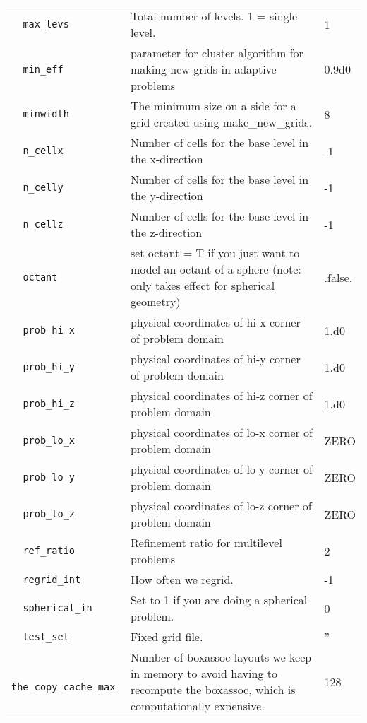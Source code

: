 \begin{landscape}
{\begin{center}
\begin{longtable}{|l|p{5.25in}|l|}
\verb=  max_levs  = &   Total number of levels.  1 = single level.  &  1 \\
\rowcolor{tableShade}
\verb=  min_eff  = &   parameter for cluster algorithm for making new grids in adaptive problems  &  0.9d0 \\
\verb=  minwidth  = &   The minimum size on a side for a grid created using make\_new\_grids.  &  8 \\
\rowcolor{tableShade}
\verb=  n_cellx  = &   Number of cells for the base level in the x-direction  &  -1 \\
\verb=  n_celly  = &   Number of cells for the base level in the y-direction  &  -1 \\
\rowcolor{tableShade}
\verb=  n_cellz  = &   Number of cells for the base level in the z-direction  &  -1 \\
\verb=  octant  = &   set octant = T if you just want to model an octant of a sphere (note: only takes effect for spherical geometry)  &  .false. \\
\rowcolor{tableShade}
\verb=  prob_hi_x  = &   physical coordinates of hi-x corner of problem domain  &  1.d0 \\
\verb=  prob_hi_y  = &   physical coordinates of hi-y corner of problem domain  &  1.d0 \\
\rowcolor{tableShade}
\verb=  prob_hi_z  = &   physical coordinates of hi-z corner of problem domain  &  1.d0 \\
\verb=  prob_lo_x  = &   physical coordinates of lo-x corner of problem domain  &  ZERO \\
\rowcolor{tableShade}
\verb=  prob_lo_y  = &   physical coordinates of lo-y corner of problem domain  &  ZERO \\
\verb=  prob_lo_z  = &   physical coordinates of lo-z corner of problem domain  &  ZERO \\
\rowcolor{tableShade}
\verb=  ref_ratio  = &   Refinement ratio for multilevel problems  &  2 \\
\verb=  regrid_int  = &   How often we regrid.  &  -1 \\
\rowcolor{tableShade}
\verb=  spherical_in  = &   Set to 1 if you are doing a spherical problem.  &  0 \\
\verb=  test_set  = &   Fixed grid file.  &  '' \\
\rowcolor{tableShade}
\verb=  the_copy_cache_max  = &    Number of boxassoc layouts we keep in memory to avoid having to recompute the boxassoc, which is computationally expensive.  &  128 \\

\end{longtable}
\end{center}}
\end{landscape}
